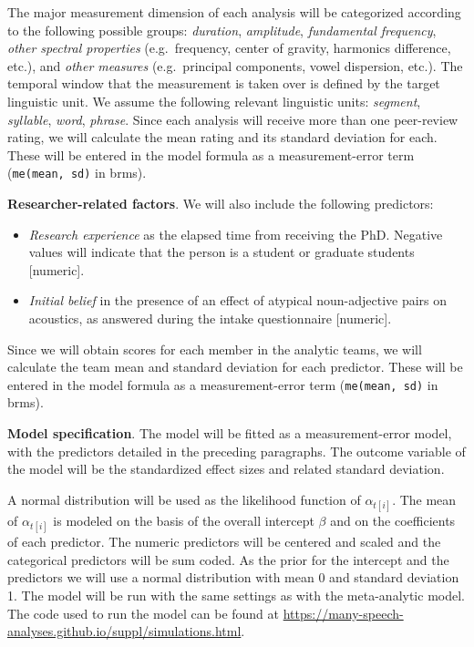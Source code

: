\documentclass[Review,times,sageh]{sagej}
\providecommand{\tightlist}{\setlength{\itemsep}{0pt}\setlength{\parskip}{0pt}}
\begin{document}
The major measurement dimension of each analysis will be categorized according to the following possible groups: \emph{duration}, \emph{amplitude}, \emph{fundamental frequency}, \emph{other spectral properties} (e.g.~frequency, center of gravity, harmonics difference, etc.), and \emph{other measures} (e.g.~principal components, vowel dispersion, etc.).
The temporal window that the measurement is taken over is defined by the target linguistic unit.
We assume the following relevant linguistic units: \emph{segment}, \emph{syllable}, \emph{word}, \emph{phrase}.
Since each analysis will receive more than one peer-review rating, we will calculate the mean rating and its standard deviation for each.
These will be entered in the model formula as a measurement-error term (\texttt{me(mean,\ sd)} in brms).

\textbf{Researcher-related factors}. We will also include the following predictors:

\begin{itemize}
\tightlist
\item
  \emph{Research experience} as the elapsed time from receiving the PhD. Negative values will indicate that the person is a student or graduate students {[}numeric{]}.
\item
  \emph{Initial belief} in the presence of an effect of atypical noun-adjective pairs on acoustics, as answered during the intake questionnaire {[}numeric{]}.
\end{itemize}

Since we will obtain scores for each member in the analytic teams, we will calculate the team mean and standard deviation for each predictor.
These will be entered in the model formula as a measurement-error term (\texttt{me(mean,\ sd)} in brms).

\textbf{Model specification}. The model will be fitted as a measurement-error model, with the predictors detailed in the preceding paragraphs.
The outcome variable of the model will be the standardized effect sizes and related standard deviation.

A normal distribution will be used as the likelihood function of \(\alpha_{t[i]}\).
The mean of \(\alpha_{t[i]}\) is modeled on the basis of the overall intercept \(\beta\) and on the coefficients of each predictor.
The numeric predictors will be centered and scaled and the categorical predictors will be sum coded.
As the prior for the intercept and the predictors we will use a normal distribution with mean 0 and standard deviation 1.
The model will be run with the same settings as with the meta-analytic model.
The code used to run the model can be found at \url{https://many-speech-analyses.github.io/suppl/simulations.html}.
\end{document}
